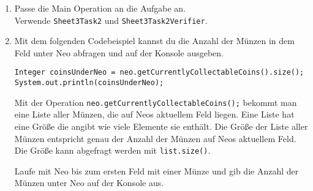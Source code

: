 
\begin{enumerate}
	\item
		Passe die Main Operation an die Aufgabe an.\\
		Verwende \lstinline{Sheet3Task2} und \lstinline{Sheet3Task2Verifier}.

	\item 
		Mit dem folgenden Codebeispiel kannst du die Anzahl der Münzen in dem Feld unter Neo abfragen und auf der Konsole ausgeben.

		\begin{lstlisting}
Integer coinsUnderNeo = neo.getCurrentlyCollectableCoins().size();
System.out.println(coinsUnderNeo);
		\end{lstlisting}

		Mit der Operation \lstinline{neo.getCurrentlyCollectableCoins();} bekommt man eine Liste aller Münzen, die auf Neos aktuellem Feld liegen. 
		Eine Liste hat eine Größe die angibt wie viele Elemente sie enthält. 
		Die Größe der Liste aller Münzen entspricht genau der Anzahl der Münzen auf Neos aktuellem Feld. 
		Die Größe kann abgefragt werden mit \lstinline{list.size()}. 

		Laufe mit Neo bis zum ersten Feld mit einer Münze und gib die Anzahl der Münzen unter Neo auf der Konsole aus.
\end{enumerate}


